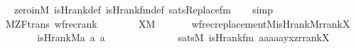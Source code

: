 \begin{isabellebody}
%
\isadelimproof
\ \ %
\endisadelimproof
%
\isatagproof
{}\isamarkupfalse%
\ zero{\isacharunderscore}{\kern0pt}in{\isacharunderscore}{\kern0pt}M\ is{\isacharunderscore}{\kern0pt}Hrank{\isacharunderscore}{\kern0pt}def\ is{\isacharunderscore}{\kern0pt}Hrank{\isacharunderscore}{\kern0pt}fm{\isacharunderscore}{\kern0pt}def\ sats{\isacharunderscore}{\kern0pt}Replace{\isacharunderscore}{\kern0pt}fm\isanewline
\ \ \isamarkupfalse%
\ simp%
\endisatagproof
{\isafoldproof}%
%
\isadelimproof
\isanewline
%
\endisadelimproof
\isanewline
\isanewline
{}\isamarkupfalse%
\ {\isacharparenleft}{\kern0pt}\ M{\isacharunderscore}{\kern0pt}ZF{\isacharunderscore}{\kern0pt}trans{\isacharparenright}{\kern0pt}\ wfrec{\isacharunderscore}{\kern0pt}rank\ {\isacharcolon}{\kern0pt}\isanewline
\ \ \isanewline
\ \ \ \ {\isachardoublequoteopen}X{\isasymin}M{\isachardoublequoteclose}\isanewline
\ \ \isanewline
\ \ \ \ {\isachardoublequoteopen}wfrec{\isacharunderscore}{\kern0pt}replacement{\isacharparenleft}{\kern0pt}{\isacharhash}{\kern0pt}{\isacharhash}{\kern0pt}M{\isacharcomma}{\kern0pt}is{\isacharunderscore}{\kern0pt}Hrank{\isacharparenleft}{\kern0pt}{\isacharhash}{\kern0pt}{\isacharhash}{\kern0pt}M{\isacharparenright}{\kern0pt}{\isacharcomma}{\kern0pt}rrank{\isacharparenleft}{\kern0pt}X{\isacharparenright}{\kern0pt}{\isacharparenright}{\kern0pt}{\isachardoublequoteclose}\isanewline
%
\isadelimproof
%
\endisadelimproof
%
\isatagproof
{}\isamarkupfalse%
\ {\isacharminus}{\kern0pt}\isanewline
\ \ \isamarkupfalse%
\isanewline
\ \ \ \ {\isachardoublequoteopen}is{\isacharunderscore}{\kern0pt}Hrank{\isacharparenleft}{\kern0pt}{\isacharhash}{\kern0pt}{\isacharhash}{\kern0pt}M{\isacharcomma}{\kern0pt}a{}{\isacharcomma}{\kern0pt}\ a{}{\isacharcomma}{\kern0pt}\ a{}{\isacharparenright}{\kern0pt}\ {\isasymlongleftrightarrow}\isanewline
\ \ \ \ \ \ \ \ \ \ \ \ \ sats{\isacharparenleft}{\kern0pt}M{\isacharcomma}{\kern0pt}\ is{\isacharunderscore}{\kern0pt}Hrank{\isacharunderscore}{\kern0pt}fm{\isacharparenleft}{\kern0pt}{}{\isacharcomma}{\kern0pt}{}{\isacharcomma}{\kern0pt}{}{\isacharparenright}{\kern0pt}{\isacharcomma}{\kern0pt}\ {\isacharbrackleft}{\kern0pt}a{}{\isacharcomma}{\kern0pt}a{}{\isacharcomma}{\kern0pt}a{}{\isacharcomma}{\kern0pt}a{}{\isacharcomma}{\kern0pt}a{}{\isacharcomma}{\kern0pt}y{\isacharcomma}{\kern0pt}x{\isacharcomma}{\kern0pt}z{\isacharcomma}{\kern0pt}rrank{\isacharparenleft}{\kern0pt}X{\isacharparenright}{\kern0pt}{\isacharbrackright}{\kern0pt}{\isacharparenright}{\kern0pt}{\isachardoublequoteclose}\isanewline

\end{isabellebody}
